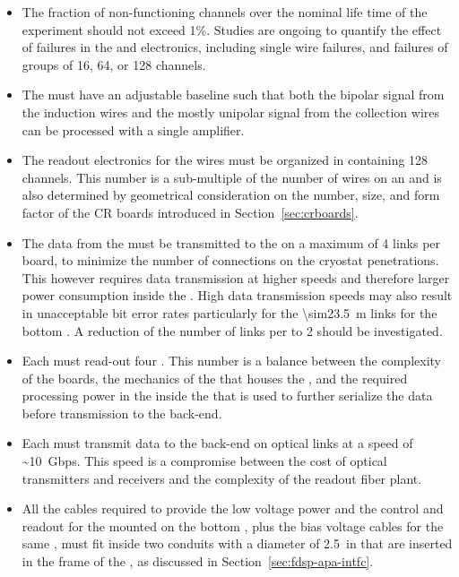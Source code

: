 \begin{itemize}
{this requirement depends on the gain of the  and
for each gain setting it translates into requirements on
the  parameters, including non-linearity and noise.}
\item{The fraction of non-functioning channels over the \dunelifetime
nominal life time of the  experiment should not
exceed 1\%. Studies are ongoing to quantify the effect of failures
in the  and electronics, including
single wire failures, and failures of groups of
\num{16}, \num{64}, or \num{128} channels.}
\item{The  must have an adjustable baseline such that both the
bipolar signal from the induction wires and the mostly unipolar signal 
from the collection wires can be processed with a single amplifier.}
\item{The readout electronics for the  wires must be organized
in  containing 128 channels. This number is a sub-multiple
of the number of wires on an  and is also determined
by geometrical consideration on the number, size, and form
factor of the CR boards introduced in Section~\ref{sec:crboards}.}
\item{The data from the  must be transmitted to the
 on a maximum of 4 links per board, to minimize
the number of connections on the cryostat penetrations. This however 
requires data transmission at higher speeds and therefore larger power 
consumption inside the . High data transmission speeds may 
also result in unacceptable bit error rates particularly for the 
\SI{\sim23.5}{m} links for the bottom . A reduction of
the number of links per  to 2 should be investigated.}
\item{Each  must read-out four . This number
is a balance between the complexity of the boards, the mechanics
of the  that houses the , and the 
required processing power in the  inside the
 that is used to further serialize the data 
before transmission to the  back-end.}
\item{Each  must transmit data to the 
back-end on optical links at a speed of \SI{~10}{Gbps}. This speed 
is a compromise between the cost of optical transmitters and
receivers and the complexity of the readout fiber plant.}
\item{All the cables required to provide the low voltage power
and the control and readout for the  mounted on
the bottom , plus the bias voltage cables for
the same , must fit inside two conduits with a
diameter of \SI{2.5}{in} that are inserted in the frame of
the , as discussed in Section~\ref{sec:fdsp-apa-intfc}.}
\end{itemize}

